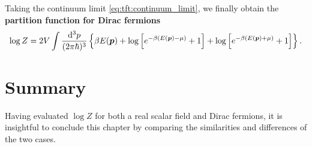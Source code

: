 Taking the continuum limit \eqref{eq:tft:continuum_limit}, we finally obtain the \textbf{partition function for Dirac fermions}
\begin{equation}
	\log Z = 2 V \int \frac{\mathop{}\!\mathrm{d}^3 p}{(2 \pi \hbar)^3} \left\{ \beta E({\bm{p}}) + \log \left[ e^{-\beta (E({\bm{p}}) - \mu)}+1 \right] + \log \left[ e^{-\beta (E({\bm{p}}) + \mu)} + 1\right] \right\} .
\label{eq:tft:dirac_partition_function}
\end{equation}

\section{Summary}

Having evaluated $\log Z$ for both a real scalar field and Dirac fermions, it is insightful to conclude this chapter by comparing the similarities and differences of the two cases.
